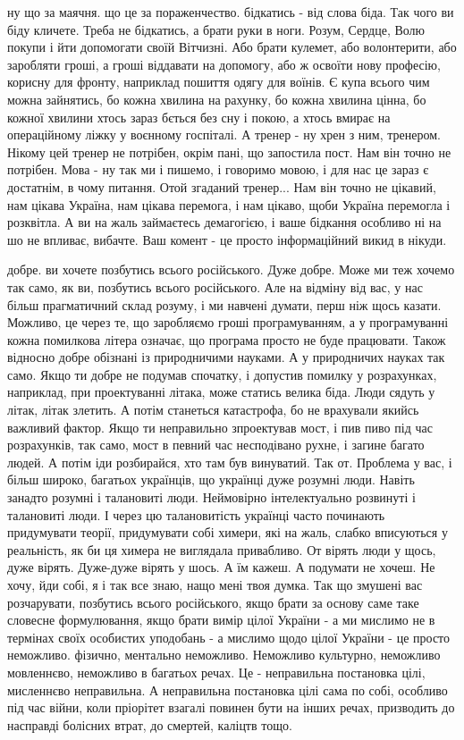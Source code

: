 ну що за маячня. що це за пораженчество. бідкатись - від слова біда. Так чого
ви біду кличете. Треба не бідкатись, а брати руки в ноги. Розум, Сердце, Волю
покупи і йти допомогати своїй Вітчизні. Або брати кулемет, або волонтерити, або
заробляти гроші, а гроші віддавати на допомогу, або ж освоїти нову професію,
корисну для фронту, наприклад пошиття одягу для воїнів. Є купа всього чим можна
зайнятись, бо кожна хвилина на рахунку, бо кожна хвилина цінна, бо кожної
хвилини хтось зараз бється без сну і покою, а хтось вмирає на операційному
ліжку у воєнному госпіталі. А тренер - ну хрен з ним, тренером. Нікому цей
тренер не потрібен, окрім пані, що запостила пост. Нам він точно не потрібен.
Мова - ну так ми і пишемо, і говоримо мовою, і для нас це зараз є достатнім, в
чому питання. Отой згаданий тренер... Нам він точно не цікавий, нам цікава
Україна, нам цікава перемога, і нам цікаво, щоби Україна перемогла і розквітла.
А ви на жаль займаєтесь демагогією, і ваше бідкання особливо ні на шо не
впливає, вибачте. Ваш комент - це просто інформаційний викид в нікуди.

добре. ви хочете позбутись всього російського. Дуже добре. Може ми теж хочемо
так само, як ви, позбутись всього російського. Але на відміну від вас, у нас
більш прагматичний склад розуму, і ми навчені думати, перш ніж щось казати.
Можливо, це через те, що заробляємо гроші програмуванням, а у програмуванні
кожна помилкова літера означає, що програма просто не буде працювати. Також
відносно добре обізнані із природничими науками. А у природничих науках так
само. Якщо ти добре не подумав спочатку, і допустив помилку у розрахунках,
наприклад, при проектуванні літака, може статись велика біда. Люди сядуть у
літак, літак злетить. А потім станеться катастрофа, бо не врахували якийсь
важливий фактор. Якщо ти неправильно зпроектував мост, і пив пиво під час
розрахунків, так само, мост в певний час несподівано рухне, і загине багато
людей. А потім іди розбирайся, хто там був винуватий. Так от. Проблема у вас, і
більш широко, багатьох українців, що українці дуже розумні люди. Навіть занадто
розумні і талановиті люди. Неймовірно інтелектуально розвинуті і талановиті
люди. І через цю талановитість українці часто починають придумувати теорії,
придумувати собі химери, які на жаль, слабко вписуються у реальність, як би ця
химера не виглядала привабливо. От вірять люди у щось, дуже вірять. Дуже-дуже
вірять у шось. А їм  кажеш. А подумати не хочеш. Не хочу, йди собі, я і так все
знаю, нащо мені твоя думка. Так що змушені вас розчарувати, позбутись всього
російського, якщо брати за основу саме таке словесне формулювання, якщо брати
вимір цілої України - а ми мислимо не в термінах своїх особистих уподобань - а
мислимо щодо цілої України - це просто неможливо. фізично, ментально неможливо.
Неможливо культурно, неможливо мовленнєво, неможливо в багатьох речах. Це -
неправильна постановка цілі, мисленнєво неправильна. А неправильна постановка
цілі сама по собі, особливо під час війни, коли пріорітет взагалі повинен бути
на інших речах, призводить до насправді болісних втрат, до смертей, каліцтв
тощо. 

